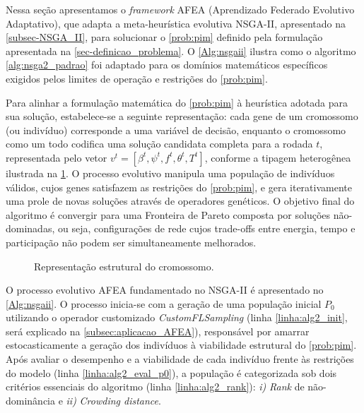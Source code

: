 Nessa seção apresentamos o \textit{framework} AFEA (Aprendizado Federado Evolutivo Adaptativo), que adapta a meta-heurística evolutiva NSGA-II, apresentado na \cref{subsec-NSGA_II}, para solucionar o \ref{prob:pim} definido pela formulação apresentada na \cref{sec-definicao_problema}. O \cref{Alg:nsgaii} ilustra como o algoritmo \cref{alg:nsga2_padrao} foi adaptado para os domínios matemáticos específicos exigidos pelos limites de operação e restrições do \ref{prob:pim}.

Para alinhar a formulação matemática do \ref{prob:pim} à heurística adotada para sua solução, estabelece-se a seguinte representação: cada gene de um cromossomo (ou indivíduo) corresponde a uma variável de decisão, enquanto o cromossomo como um todo codifica uma solução candidata completa para a rodada $t$, representada pelo vetor 
$v^t = [\beta^t, \psi^t, f^t, \theta^t, T^t]$, conforme a tipagem heterogênea ilustrada na \cref{fig:cromossomo}. O processo evolutivo manipula uma população de indivíduos válidos, cujos genes satisfazem as restrições do \ref{prob:pim}, e gera iterativamente uma prole de novas soluções através de operadores genéticos. O objetivo final do algoritmo é convergir para uma Fronteira de Pareto composta por soluções não-dominadas, ou seja, configurações de rede cujos trade-offs entre energia, tempo e participação não podem ser simultaneamente melhorados.

\begin{figure}
    \centering
    \resizebox{\textwidth}{!}{%
    
    }
    \caption{Representação estrutural do cromossomo.}
    \label{fig:cromossomo}
    \vspace{-0.3cm}
\end{figure}


O processo evolutivo AFEA fundamentado no NSGA-II é apresentado no \cref{Alg:nsgaii}. O processo inicia-se com a geração de uma população inicial $P_0$ utilizando o operador customizado \textit{CustomFLSampling} (linha \ref{linha:alg2_init}, será explicado na \cref{subsec:aplicacao_AFEA}), responsável por amarrar estocasticamente a geração dos indivíduos à viabilidade estrutural do \ref{prob:pim}. Após avaliar o desempenho e a viabilidade de cada indivíduo frente às restrições do modelo (linha \ref{linha:alg2_eval_p0}), a população é categorizada sob dois critérios essenciais do algoritmo (linha \ref{linha:alg2_rank}): \textit{i)} \textit{Rank} de não-dominância e \textit{ii)} \textit{Crowding distance}.

